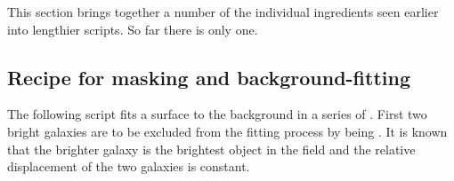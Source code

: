 This section brings together a number of the individual ingredients
seen earlier into lengthier scripts.  So far there is only one.

\subsection{Recipe for masking and background-fitting
\label{sc4_se_long1}}

The following script fits a surface to the background in a series of
. 
First two bright galaxies are to be excluded from the fitting process by
being .  It is known that the brighter
galaxy is the brightest object in the field and the relative
displacement of the two galaxies is constant.

